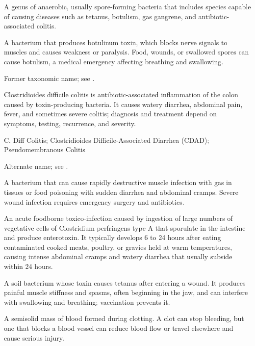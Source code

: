  A genus of anaerobic, usually spore-forming bacteria that includes species capable of
causing diseases such as tetanus, botulism, gas gangrene, and antibiotic-associated
colitis.

 A bacterium that produces botulinum toxin, which blocks nerve signals to muscles and causes weakness or paralysis. Food, wounds, or swallowed spores can cause botulism, a medical emergency affecting breathing and swallowing.

 Former taxonomic name; see .

 Clostridioides difficile colitis is antibiotic-associated inflammation of the colon caused by toxin-producing bacteria. It causes watery diarrhea, abdominal pain, fever, and sometimes severe colitis; diagnosis and treatment depend on symptoms, testing, recurrence, and severity.

\synonyms
C. Diff Colitis; Clostridioides Difficile-Associated Diarrhea (CDAD); Pseudomembranous Colitis

 Alternate name; see .

 A bacterium that can cause rapidly destructive muscle infection with gas in tissues or food poisoning with sudden diarrhea and abdominal cramps. Severe wound infection requires emergency surgery and antibiotics.

 An acute foodborne toxico-infection caused by ingestion of large numbers of vegetative cells of Clostridium perfringens type A that sporulate in the intestine and produce enterotoxin. It typically develops 6 to 24 hours after eating contaminated cooked meats, poultry, or gravies held at warm temperatures, causing intense abdominal cramps and watery diarrhea that usually subside within 24 hours.

 A soil bacterium whose toxin causes tetanus after entering a wound. It produces painful muscle stiffness and spasms, often beginning in the jaw, and can interfere with swallowing and breathing; vaccination prevents it.

 A semisolid mass of blood formed during clotting. A clot can stop bleeding, but one that blocks a blood vessel can reduce blood flow or travel elsewhere and cause serious injury.

